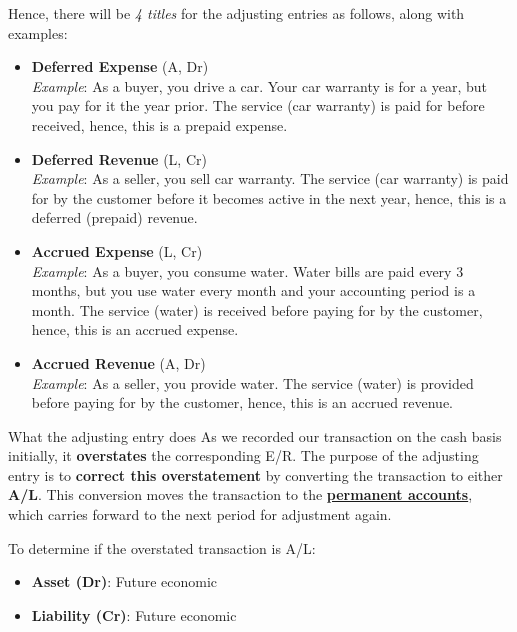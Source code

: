 Hence, there will be \textit{4 titles} for the adjusting entries as follows, along with examples:
\begin{itemize}
    \item \textbf{Deferred Expense} (A, Dr)\\
          \textit{Example}: As a buyer, you drive a car. Your car warranty is for a year, but you pay for it the year prior. The service (car warranty) is paid for before received, hence, this is a prepaid expense.

          \vspace{1em}
    \item \textbf{Deferred Revenue} (L, Cr)\\
          \textit{Example}: As a seller, you sell car warranty. The service (car warranty) is paid for by the customer before it becomes active in the next year, hence, this is a deferred (prepaid) revenue.

          \vspace{1em}
    \item \textbf{Accrued Expense} (L, Cr)\\
          \textit{Example}: As a buyer, you consume water. Water bills are paid every 3 months, but you use water every month and your accounting period is a month. The service (water) is received before paying for by the customer, hence, this is an accrued expense.

          \vspace{1em}
    \item \textbf{Accrued Revenue} (A, Dr)\\
          \textit{Example}: As a seller, you provide water. The service (water) is provided before paying for by the customer, hence, this is an accrued revenue.

          \vspace{1em}
\end{itemize}

\begin{theorem}
    {What the adjusting entry does}
    As we recorded our transaction on the cash basis initially, it \textbf{overstates} the corresponding E/R. The purpose of the adjusting entry is to \textbf{correct this overstatement} by converting the transaction to either \textbf{A/L}. This conversion moves the transaction to the \hyperref[def:temp_perm]{\textbf{permanent accounts}}, which carries forward to the next period for adjustment again.

    To determine if the overstated transaction is A/L:
    \begin{itemize}
        \item \textbf{Asset (Dr)}: Future economic
        \item \textbf{Liability (Cr)}: Future economic
    \end{itemize}
    \label{thm:adjusting_entry}
\end{theorem}


